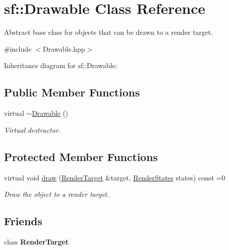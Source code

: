 \hypertarget{classsf_1_1_drawable}{}\section{sf\+:\+:Drawable Class Reference}
\label{classsf_1_1_drawable}


Abstract base class for objects that can be drawn to a render target.  




{\ttfamily \#include $<$Drawable.\+hpp$>$}



Inheritance diagram for sf\+:\+:Drawable\+:
\subsection*{Public Member Functions}
\begin{DoxyCompactItemize}
\item 
\mbox{\label{classsf_1_1_drawable_a906002f2df7beb5edbddf5bbef96f120}} 
virtual \hyperlink{classsf_1_1_drawable_a906002f2df7beb5edbddf5bbef96f120}{$\sim$\+Drawable} ()
\begin{DoxyCompactList}\small\item\em Virtual destructor. \end{DoxyCompactList}\end{DoxyCompactItemize}
\subsection*{Protected Member Functions}
\begin{DoxyCompactItemize}
\item 
virtual void \hyperlink{classsf_1_1_drawable_a90d2c88bba9b035a0844eccb380ef631}{draw} (\hyperlink{classsf_1_1_render_target}{Render\+Target} \&target, \hyperlink{classsf_1_1_render_states}{Render\+States} states) const =0
\begin{DoxyCompactList}\small\item\em Draw the object to a render target. \end{DoxyCompactList}\end{DoxyCompactItemize}
\subsection*{Friends}
\begin{DoxyCompactItemize}
\item 
\mbox{\label{classsf_1_1_drawable_aa5afc6f82b7b587ed5ada4d227ce32aa}} 
class {\bfseries Render\+Target}
\end{DoxyCompactItemize}


